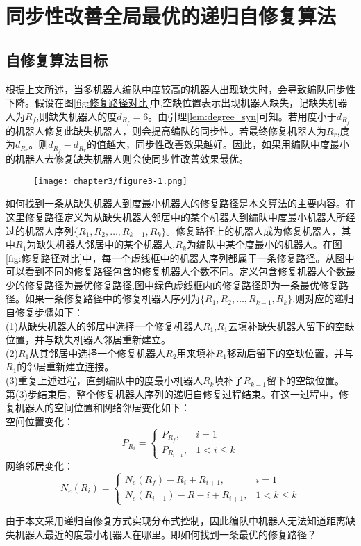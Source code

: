 
\chapter{同步性改善全局最优的递归自修复算法}

\section{自修复算法目标}
根据上文所述，当多机器人编队中度较高的机器人出现缺失时，会导致编队同步性下降。假设在图\ref{fig:修复路径对比}中,空缺位置表示出现机器人缺失，记缺失机器人为$R_f$,则缺失机器人的度$d_{R_f} = 6$。由引理\ref{lem:degree_syn}可知。若用度小于$d_{R_f}$的机器人修复此缺失机器人，则会提高编队的同步性。若最终修复机器人为$R_r$,度为$d_{R_r}$。则$d_{R_f}-d_{R_r}$的值越大，同步性改善效果越好。因此，如果用编队中度最小的机器人去修复缺失机器人则会使同步性改善效果最优。
\begin{figure}[!htbp]
	\centering
	\texttt{[image: chapter3/figure3-1.png]}
\end{figure}

如何找到一条从缺失机器人到度最小机器人的修复路径是本文算法的主要内容。在这里修复路径定义为从缺失机器人邻居中的某个机器人到编队中度最小机器人所经过的机器人序列$\{R_1,R_2,\dots,R_{k-1},R_k\}$。修复路径上的机器人成为修复机器人，其中$R_1$为缺失机器人邻居中的某个机器人,$R_k$为编队中某个度最小的机器人。在图\ref{fig:修复路径对比}中，每一个虚线框中的机器人序列都属于一条修复路径。从图中可以看到不同的修复路径包含的修复机器人个数不同。定义包含修复机器人个数最少的修复路径为最优修复路径,图中绿色虚线框内的修复路径即为一条最优修复路径。如果一条修复路径中的修复机器人序列为$\{R_1,R_2,\dots,R_{k-1},R_k\}$,则对应的递归自修复步骤如下：\\
\indent (1)从缺失机器人的邻居中选择一个修复机器人$R_1$,$R_1$去填补缺失机器人留下的空缺位置，并与缺失机器人邻居重新建立。\\
\indent (2)$R_1$从其邻居中选择一个修复机器人$R_2$用来填补$R_1$移动后留下的空缺位置，并与$R_1$的邻居重新建立连接。\\
\indent (3)重复上述过程，直到编队中的度最小机器人$R_k$填补了$R_{k-1}$留下的空缺位置。\\
第(3)步结束后，整个修复机器人序列的递归自修复过程结束。在这一过程中，修复机器人的空间位置和网络邻居变化如下：\\
空间位置变化：\\
\begin{equation}
	P_{R_i} = 
	\begin{cases}
		P_{R_f}, & i=1 \\
		P_{R_{i-1}}, & 1 < i \leq k
	\end{cases}
\end{equation}
网络邻居变化：\\
\begin{equation}
	N_e(R_i) = 
	\begin{cases}
		N_e(R_f) - R_i + R_{i+1}, & i = 1 \\
		N_e(R_{i-1}) - R-i + R_{i+1}, & 1<k \leq k
	\end{cases}
\end{equation}

由于本文采用递归自修复方式实现分布式控制，因此编队中机器人无法知道距离缺失机器人最近的度最小机器人在哪里。即如何找到一条最优的修复路径？
